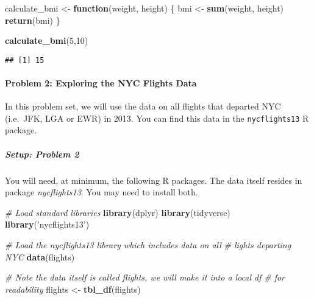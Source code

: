 \documentclass[
]{article}
\newenvironment{Shaded}{\begin{snugshade}}{\end{snugshade}}
\newcommand{\CommentTok}[1]{\textcolor[rgb]{0.56,0.35,0.01}{\textit{#1}}}
\newcommand{\ControlFlowTok}[1]{\textcolor[rgb]{0.13,0.29,0.53}{\textbf{#1}}}
\newcommand{\DecValTok}[1]{\textcolor[rgb]{0.00,0.00,0.81}{#1}}
\newcommand{\KeywordTok}[1]{\textcolor[rgb]{0.13,0.29,0.53}{\textbf{#1}}}
\newcommand{\NormalTok}[1]{#1}
\newcommand{\StringTok}[1]{\textcolor[rgb]{0.31,0.60,0.02}{#1}}
\begin{document}
\begin{Shaded}
\begin{Highlighting}[]
\NormalTok{calculate_bmi <-}\StringTok{ }\ControlFlowTok{function}\NormalTok{(weight, height) \{}
\NormalTok{  bmi <-}\StringTok{ }\KeywordTok{sum}\NormalTok{(weight, height)}
  \KeywordTok{return}\NormalTok{(bmi)}
\NormalTok{\}}

\KeywordTok{calculate_bmi}\NormalTok{(}\DecValTok{5}\NormalTok{,}\DecValTok{10}\NormalTok{)}
\end{Highlighting}
\end{Shaded}

\begin{verbatim}
## [1] 15
\end{verbatim}

\hypertarget{problem-2-exploring-the-nyc-flights-data}{%
\paragraph{Problem 2: Exploring the NYC Flights
Data}\label{problem-2-exploring-the-nyc-flights-data}}

In this problem set, we will use the data on all flights that departed
NYC (i.e.~JFK, LGA or EWR) in 2013. You can find this data in the
\texttt{nycflights13} R package.

\hypertarget{setup-problem-2}{%
\subparagraph{Setup: Problem 2}\label{setup-problem-2}}

You will need, at minimum, the following R packages. The data itself
resides in package \emph{nycflights13}. You may need to install both.

\begin{Shaded}
\begin{Highlighting}[]
\CommentTok{# Load standard libraries}
\KeywordTok{library}\NormalTok{(dplyr)}
\KeywordTok{library}\NormalTok{(tidyverse)}
\KeywordTok{library}\NormalTok{(}\StringTok{'nycflights13'}\NormalTok{)}
\end{Highlighting}
\end{Shaded}

\begin{Shaded}
\begin{Highlighting}[]
\CommentTok{# Load the nycflights13 library which includes data on all}
\CommentTok{# lights departing NYC}
\KeywordTok{data}\NormalTok{(flights)}

\CommentTok{# Note the data itself is called flights, we will make it into a local df}
\CommentTok{# for readability}
\NormalTok{flights <-}\StringTok{ }\KeywordTok{tbl_df}\NormalTok{(flights)}
\end{Highlighting}
\end{Shaded}
\end{document}
